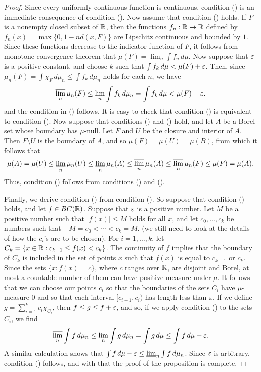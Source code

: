 \begin{proof}
Since every uniformly continuous function is continuous, condition () is an immediate consequence of condition (). Now assume that condition () holds. If $F$ is a nonempty closed subset of $\mathbb{R}$, then the functions $f_n:\mathbb{R}\to\mathbb{R}$ defined by $f_n(x)=\max\{0,1-nd(x,F)\}$ are Lipschitz continuous and bounded by $1$. Since these functions decrease to the indicator function of $F$, it follows from monotone convergence theorem that $\mu(F)=\lim_n\int f_n\,d\mu$. Now suppose that $\varepsilon$ is a positive constant, and choose $k$ such that $\int f_k\,d\mu<\mu(F)+\varepsilon$. Then, since $\mu_n(F)=\int\chi_F\,d\mu_n\leq\int f_k\,d\mu_n$ holds for each $n$, we have
\[\varlimsup_n\mu_n(F)\leq\lim_n\int f_k\,d\mu_n=\int f_k\,d\mu<\mu(F)+\varepsilon.\]
and the condition in () follows. It is easy to check that condition () is equivalent to condition (). Now suppose that conditions () and () hold, and let $A$ be a Borel set whose boundary has $\mu$-null. Let $F$ and $U$ be the closure and interior of $A$. Then $F\setminus U$ is the boundary of $A$, and so $\mu(F)=\mu(U)=\mu(B)$, from which it follows that
\[\mu(A)=\mu(U)\leq\varliminf_n\mu_n(U)\leq\varliminf_n\mu_n(A)\leq\varlimsup_n\mu_n(A)\leq\varlimsup_n\mu_n(F)\leq\mu(F)=\mu(A).\]
Thus, condition () follows from conditions () and ().\par
Finally, we derive condition () from condition (). So suppose that condition () holds, and let $f\in BC(\mathbb{R})$. Suppose that $\varepsilon$ is a positive number. Let $M$ be a positive number such that $|f(x)|\leq M$ holds for all $x$, and let $c_0,\dots,c_k$ be numbers such that $-M=c_0<\cdots<c_k=M$. (we still need to look at the details of how the $c_i$'s are to be chosen). For $i=1,\dots,k$, let $C_k=\{x\in\mathbb{R}:c_{k-1}\leq f(x)<c_k\}$. The continuity of $f$ implies that the boundary of $C_k$ is included in the set of points $x$ such that $f(x)$ is equal to $c_{k-1}$ or $c_k$. Since the sets $\{x:f(x)=c\}$, where $c$ ranges over $\mathbb{R}$, are disjoint and Borel, at most a countable number of them can have positive measure under $\mu$. It follows that we can choose our points $c_i$ so that the boundaries of the sets $C_i$ have $\mu$-measure $0$ and so that each interval $[c_{i-1},c_i)$ has length less than $\varepsilon$. If we define $g=\sum_{i=1}^{k}c_i\chi_{C_i}$, then $f\leq g\leq f+\varepsilon$, and so, if we apply condition () to the sets $C_i$, we find
\begin{align*}
\varlimsup_n\int f\,d\mu_n\leq\lim_n\int g\,d\mu_n=\int g\,d\mu\leq\int f\,d\mu+\varepsilon.
\end{align*}
A similar calculation shows that $\int f\,d\mu-\varepsilon\leq\varliminf_n\int f\,d\mu_n$. Since $\varepsilon$ is arbitrary, condition () follows, and with that the proof of the proposition is complete.
\end{proof}
